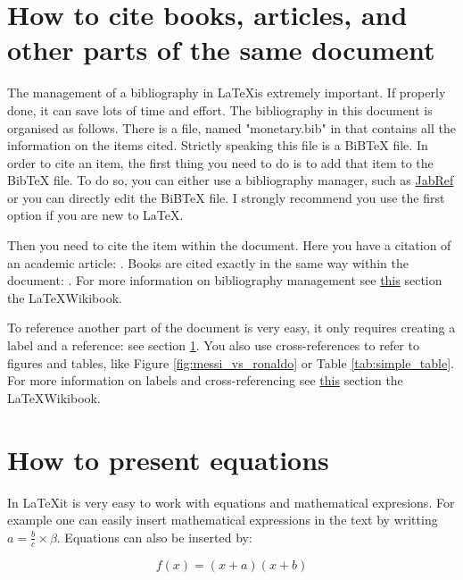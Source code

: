 \documentclass[11pt,a4paper,oneside]{book}
\newcommand{\latex}{\LaTeX{}} %
\begin{document}
\section{How to cite books, articles, and other parts of the same document}
\label{sec:citations}
The management of a bibliography in \latex is extremely important. If properly done, it can save lots of time and effort. The bibliography in this document is organised as follows. There is a file, named "monetary.bib" in that contains all the information on the items cited. Strictly speaking this file is a BiBTeX file. In order to cite an item, the first thing you need to do is to add that item to the BibTeX file. To do so, you can either use a bibliography manager, such as \href{http://www.jabref.org/}{JabRef} or you can directly edit the BiBTeX file. I strongly recommend you use the first option if you are new to \latex.

Then you need to cite the item within the document. Here you have a citation of an academic article: \citet*{Cooley_Hansen_1989}. Books are cited exactly in the same way within the document: \citet*{Blanchard_2017}. For more information on bibliography management see \href{https://en.wikibooks.org/wiki/LaTeX/Bibliography_Management}{this} section the \latex Wikibook.

To reference another part of the document is very easy, it only requires creating a label and a reference: see section \ref{sec:citations}. You also use cross-references to refer to figures and tables, like Figure \ref{fig:messi_vs_ronaldo} or Table \ref{tab:simple_table}. For more information on labels and cross-referencing see \href{https://en.wikibooks.org/wiki/LaTeX/Labels_and_Cross-referencing}{this} section the \latex Wikibook.

\section{How to present equations}
\label{sec:math}
In \latex it is very easy to work with equations and mathematical expresions. For example one can easily insert mathematical expressions in the text by writting $ a = \frac{b}{c} \times \beta $. Equations can also be inserted by:

\begin{equation}
  f(x)=(x+a)(x+b)
  \label{eq:function}
\end{equation}
\end{document}
